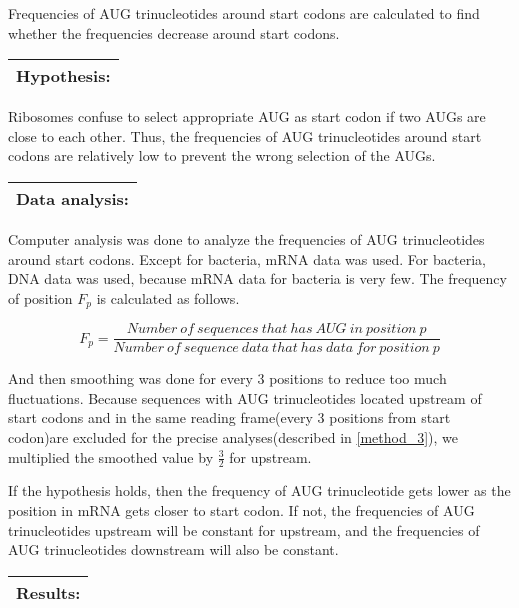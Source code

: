 
Frequencies of AUG trinucleotides around start codons are calculated
to find whether the frequencies decrease around start codons.

\vspace{2ex}
\noindent
\begin{tabular}{|l|}
\hline
Hypothesis:\\
\hline
\end{tabular}

Ribosomes confuse to select appropriate AUG as 
start codon if two AUGs are close to each other. Thus, the frequencies
of AUG trinucleotides around start codons are relatively low to
prevent the wrong selection of the AUGs.

\vspace{2ex}
\noindent
\begin{tabular}{|l|}
\hline
Data analysis:\\
\hline
\end{tabular}

Computer analysis was done to analyze the
frequencies of AUG trinucleotides around start codons. Except for
bacteria, mRNA data was used. For bacteria, DNA data was used, because
mRNA data for bacteria is very few. The frequency of position \(F_{p}\) is
calculated as follows.

\begin{displaymath}
F_{p} = \frac{Number\:of\:sequences\:that\:has\:AUG\:in\:position\:p}
      {Number\:of\:sequence\:data\:that\:has\:data\:for\:position\:p}
\end{displaymath}

And then smoothing was done for every 3 positions to reduce too much 
fluctuations. Because sequences with AUG trinucleotides located
upstream of start 
codons and in the same reading frame(every 3 positions from start
codon)are excluded for the precise analyses(described in
\ref{method_3}), we multiplied the smoothed  
value by \(\frac{3}{2}\) for upstream.

If the hypothesis holds, then the frequency of AUG trinucleotide gets
lower as the position in mRNA gets closer to start codon.
If not, the frequencies of AUG trinucleotides upstream will be constant for
upstream, and the frequencies of AUG trinucleotides downstream will
also be constant.

\vspace{2ex}
\noindent
\begin{tabular}{|l|}
\hline
Results:\\
\hline
\end{tabular}

